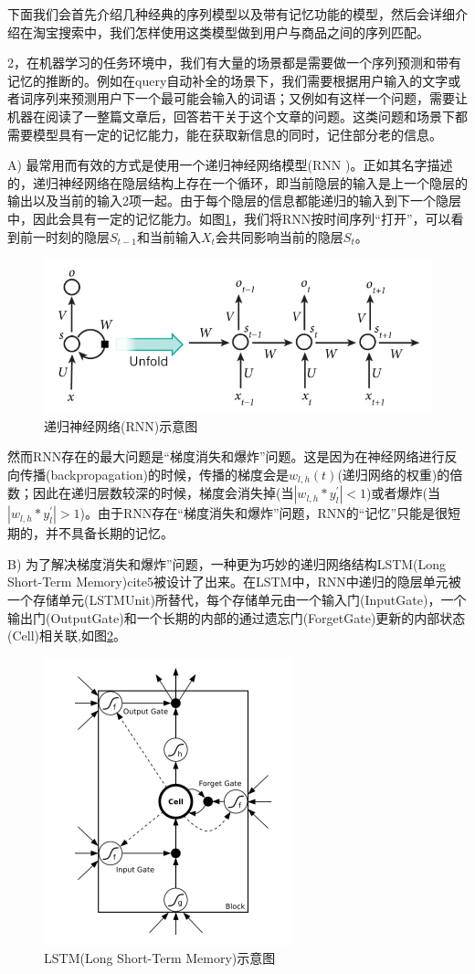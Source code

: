 下面我们会首先介绍几种经典的序列模型以及带有记忆功能的模型，然后会详细介绍在淘宝搜索中，我们怎样使用这类模型做到用户与商品之间的序列匹配。

2，在机器学习的任务环境中，我们有大量的场景都是需要做一个序列预测和带有记忆的推断的。例如在query自动补全的场景下，我们需要根据用户输入的文字或者词序列来预测用户下一个最可能会输入的词语；又例如有这样一个问题，需要让机器在阅读了一整篇文章后，回答若干关于这个文章的问题。这类问题和场景下都需要模型具有一定的记忆能力，能在获取新信息的同时，记住部分老的信息。

A) 最常用而有效的方式是使用一个递归神经网络模型(RNN \cite{4,5})。正如其名字描述的，递归神经网络在隐层结构上存在一个循环，即当前隐层的输入是上一个隐层的输出以及当前的输入2项一起。由于每个隐层的信息都能递归的输入到下一个隐层中，因此会具有一定的记忆能力。如图\ref{fig:RNN}，我们将RNN按时间序列“打开”，可以看到前一时刻的隐层$S_{t-1}$和当前输入$X_t$会共同影响当前的隐层$S_{t}$。

\begin{figure}
	\centering
	\includegraphics[width=0.8\linewidth]{"fig/RNN"}
	\caption{递归神经网络(RNN)示意图}
	\label{fig:RNN}
\end{figure}	

然而RNN存在的最大问题是“梯度消失和爆炸”问题\cite{6}。这是因为在神经网络进行反向传播(backpropagation)的时候，传播的梯度会是$w_{l,h}(t)$(递归网络的权重)的倍数；因此在递归层数较深的时候，梯度会消失掉(当$|w_{l,h}*y^{'}_{l}|<1$)或者爆炸(当$|w_{l,h}*y^{'}_{l}|>1$)。由于RNN存在“梯度消失和爆炸”问题，RNN的“记忆”只能是很短期的，并不具备长期的记忆。

B) 为了解决梯度消失和爆炸”问题，一种更为巧妙的递归网络结构LSTM(Long Short-Term Memory)cite{5}被设计了出来。在LSTM中，RNN中递归的隐层单元被一个存储单元(LSTMUnit)所替代，每个存储单元由一个输入门(InputGate)，一个输出门(OutputGate)和一个长期的内部的通过遗忘门(ForgetGate)更新的内部状态(Cell)相关联,如图\ref{fig:LSTM}。

\begin{figure}[h]
	\centering
	\includegraphics[width=0.3\linewidth]{"fig/LSTM"}
	\caption{LSTM(Long Short-Term Memory)示意图}
	\label{fig:LSTM}
\end{figure}

